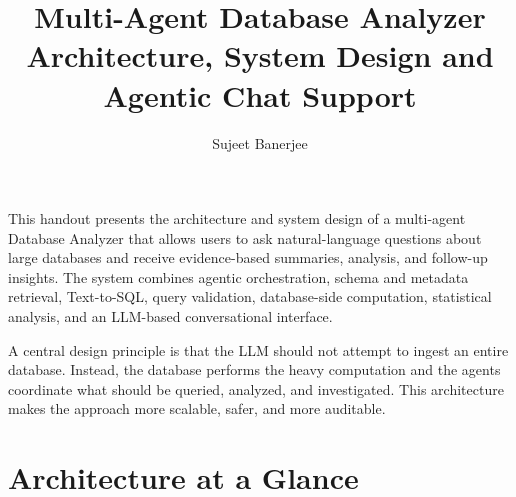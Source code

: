 \documentclass[11pt,a4paper]{article}
\title{\textbf{Multi-Agent Database Analyzer}\\
\large Architecture, System Design and Agentic Chat Support}
\author{Sujeet Banerjee}
\date{}
\begin{document}
\maketitle

\begin{description}
 
This handout presents the architecture and system design of a multi-agent
Database Analyzer that allows users to ask natural-language questions about
large databases and receive evidence-based summaries, analysis, and
follow-up insights. The system combines agentic orchestration, schema and
metadata retrieval, Text-to-SQL, query validation, database-side computation,
statistical analysis, and an LLM-based conversational interface.

A central design principle is that the LLM should not attempt to ingest an
entire database. Instead, the database performs the heavy computation and the
agents coordinate what should be queried, analyzed, and investigated. This
architecture makes the approach more scalable, safer, and more auditable.
\end{description}


\section*{Architecture at a Glance}
\end{document}
